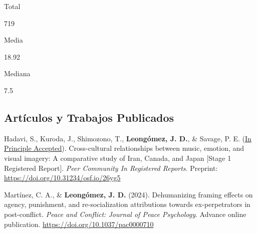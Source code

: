 \documentclass[11pt,a4paper,]{awesome-cv}
\begin{document}
\begin{tcolorbox}[enhanced,
        on line, 
        boxsep=4pt, left=0pt,right=0pt,top=0pt,bottom=0pt,
        colframe=white,colback=teal,
        hyperurl={https://scholar.google.com/citations?user=8Q0jKHsAAAAJ}]
  \begin{minipage}[c]{0.325\linewidth}  
    \begin{center} 
      \begin{small} Total \end{small} 
      \begin{LARGE} 719 \end{LARGE} 
    \end{center}
  \end{minipage} 
  \begin{minipage}[c]{0.325\linewidth}
    \begin{center} 
      \begin{small} Media \end{small} 
      \begin{LARGE} 18.92 \end{LARGE}
    \end{center}
  \end{minipage} 
  \begin{minipage}[c]{0.325\linewidth}
    \begin{center}  
      \begin{small} Mediana \end{small} 
      \begin{LARGE} 7.5 \end{LARGE}
   \end{center}
  \end{minipage} 
\end{tcolorbox}

\subsection{\texorpdfstring{\textbf{Artículos y Trabajos Publicados}}{}}\label{section}

\begingroup
\footnotesize
\setlength{\parindent}{-0.5in}
\setlength{\leftskip}{0.5in}

Hadavi, S., Kuroda, J., Shimozono, T., \textbf{Leongómez, J. D.}, \&
Savage, P. E.
(\href{https://rr.peercommunityin.org/articles/rec?id=416}{In Principle
Accepted}). Cross-cultural relationships between music, emotion, and
visual imagery: A comparative study of Iran, Canada, and Japan {[}Stage
1 Registered Report{]}. \emph{Peer Community In Registered Reports}.
Preprint: \url{https://doi.org/10.31234/osf.io/26yg5}

Martínez, C. A., \& \textbf{Leongómez, J. D.} (2024). Dehumanizing
framing effects on agency, punishment, and re-socialization attributions
towards ex-perpetrators in post-conflict. \emph{Peace and Conflict:
Journal of Peace Psychology}. Advance online publication.
\url{https://doi.org/10.1037/pac0000710}
\end{document}
